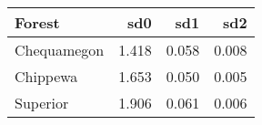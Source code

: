 \begin{table}[ht]
\begin{center}
\begin{tabular}{lrrr}
  \hline
Forest & sd0 & sd1 & sd2 \\ 
  \hline
Chequamegon & 1.418 & 0.058 & 0.008 \\ 
  Chippewa & 1.653 & 0.050 & 0.005 \\ 
  Superior & 1.906 & 0.061 & 0.006 \\ 
   \hline
\end{tabular}
\end{center}
\end{table}
